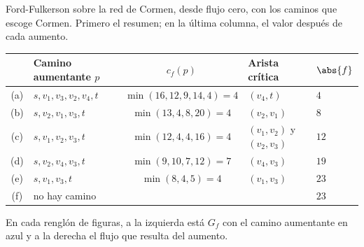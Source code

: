 \documentclass[11pt,letterpaper]{article}
\begin{document}
\begin{ejemplo}\label{ej:flujo-ff266}
  Ford-Fulkerson sobre la red de Cormen, desde flujo cero, con los
  caminos que escoge Cormen. Primero el resumen; en la última columna,
  el valor después de cada aumento.
  \begin{center}
  \small
  \begin{tabular}{clcll}
    \toprule
    & \textbf{Camino aumentante $p$} & $c_f(p)$
      & \textbf{Arista crítica} & $\abs{f}$ \\
    \midrule
    (a) & $s, v_1, v_3, v_2, v_4, t$ & $\min(16, 12, 9, 14, 4) = 4$
        & $(v_4, t)$ & $4$ \\
    (b) & $s, v_2, v_1, v_3, t$ & $\min(13, 4, 8, 20) = 4$
        & $(v_2, v_1)$ & $8$ \\
    (c) & $s, v_1, v_2, v_3, t$ & $\min(12, 4, 4, 16) = 4$
        & $(v_1, v_2)$ y $(v_2, v_3)$ & $12$ \\
    (d) & $s, v_2, v_4, v_3, t$ & $\min(9, 10, 7, 12) = 7$
        & $(v_4, v_3)$ & $19$ \\
    (e) & $s, v_1, v_3, t$ & $\min(8, 4, 5) = 4$
        & $(v_1, v_3)$ & $23$ \\
    (f) & no hay camino & & & $23$ \\
    \bottomrule
  \end{tabular}
  \end{center}
  En cada renglón de figuras, a la izquierda está $G_f$ con el camino
  aumentante en azul y a la derecha el flujo que resulta del aumento.


\end{ejemplo}
\end{document}
